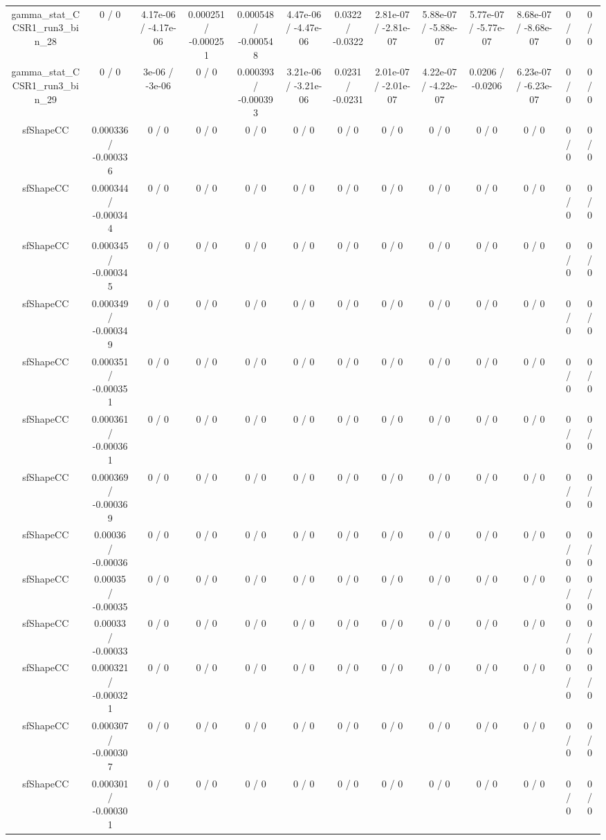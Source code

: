 \documentclass[10pt]{article}
\begin{document}
\begin{table}[htbp]
\begin{center}
\begin{tabular}{|c|c|c|c|c|c|c|c|c|c|c|c|c|}
  gamma_stat_CCSR1_run3_bin_28 & 0 / 0 & 4.17e-06 / -4.17e-06 & 0.000251 / -0.000251 & 0.000548 / -0.000548 & 4.47e-06 / -4.47e-06 & 0.0322 / -0.0322 & 2.81e-07 / -2.81e-07 & 5.88e-07 / -5.88e-07 & 5.77e-07 / -5.77e-07 & 8.68e-07 / -8.68e-07 & 0 / 0 & 0 / 0 \\ 
  gamma_stat_CCSR1_run3_bin_29 & 0 / 0 & 3e-06 / -3e-06 & 0 / 0 & 0.000393 / -0.000393 & 3.21e-06 / -3.21e-06 & 0.0231 / -0.0231 & 2.01e-07 / -2.01e-07 & 4.22e-07 / -4.22e-07 & 0.0206 / -0.0206 & 6.23e-07 / -6.23e-07 & 0 / 0 & 0 / 0 \\ 
  sfShapeCC & 0.000336 / -0.000336 & 0 / 0 & 0 / 0 & 0 / 0 & 0 / 0 & 0 / 0 & 0 / 0 & 0 / 0 & 0 / 0 & 0 / 0 & 0 / 0 & 0 / 0 \\ 
  sfShapeCC & 0.000344 / -0.000344 & 0 / 0 & 0 / 0 & 0 / 0 & 0 / 0 & 0 / 0 & 0 / 0 & 0 / 0 & 0 / 0 & 0 / 0 & 0 / 0 & 0 / 0 \\ 
  sfShapeCC & 0.000345 / -0.000345 & 0 / 0 & 0 / 0 & 0 / 0 & 0 / 0 & 0 / 0 & 0 / 0 & 0 / 0 & 0 / 0 & 0 / 0 & 0 / 0 & 0 / 0 \\ 
  sfShapeCC & 0.000349 / -0.000349 & 0 / 0 & 0 / 0 & 0 / 0 & 0 / 0 & 0 / 0 & 0 / 0 & 0 / 0 & 0 / 0 & 0 / 0 & 0 / 0 & 0 / 0 \\ 
  sfShapeCC & 0.000351 / -0.000351 & 0 / 0 & 0 / 0 & 0 / 0 & 0 / 0 & 0 / 0 & 0 / 0 & 0 / 0 & 0 / 0 & 0 / 0 & 0 / 0 & 0 / 0 \\ 
  sfShapeCC & 0.000361 / -0.000361 & 0 / 0 & 0 / 0 & 0 / 0 & 0 / 0 & 0 / 0 & 0 / 0 & 0 / 0 & 0 / 0 & 0 / 0 & 0 / 0 & 0 / 0 \\ 
  sfShapeCC & 0.000369 / -0.000369 & 0 / 0 & 0 / 0 & 0 / 0 & 0 / 0 & 0 / 0 & 0 / 0 & 0 / 0 & 0 / 0 & 0 / 0 & 0 / 0 & 0 / 0 \\ 
  sfShapeCC & 0.00036 / -0.00036 & 0 / 0 & 0 / 0 & 0 / 0 & 0 / 0 & 0 / 0 & 0 / 0 & 0 / 0 & 0 / 0 & 0 / 0 & 0 / 0 & 0 / 0 \\ 
  sfShapeCC & 0.00035 / -0.00035 & 0 / 0 & 0 / 0 & 0 / 0 & 0 / 0 & 0 / 0 & 0 / 0 & 0 / 0 & 0 / 0 & 0 / 0 & 0 / 0 & 0 / 0 \\ 
  sfShapeCC & 0.00033 / -0.00033 & 0 / 0 & 0 / 0 & 0 / 0 & 0 / 0 & 0 / 0 & 0 / 0 & 0 / 0 & 0 / 0 & 0 / 0 & 0 / 0 & 0 / 0 \\ 
  sfShapeCC & 0.000321 / -0.000321 & 0 / 0 & 0 / 0 & 0 / 0 & 0 / 0 & 0 / 0 & 0 / 0 & 0 / 0 & 0 / 0 & 0 / 0 & 0 / 0 & 0 / 0 \\ 
  sfShapeCC & 0.000307 / -0.000307 & 0 / 0 & 0 / 0 & 0 / 0 & 0 / 0 & 0 / 0 & 0 / 0 & 0 / 0 & 0 / 0 & 0 / 0 & 0 / 0 & 0 / 0 \\ 
  sfShapeCC & 0.000301 / -0.000301 & 0 / 0 & 0 / 0 & 0 / 0 & 0 / 0 & 0 / 0 & 0 / 0 & 0 / 0 & 0 / 0 & 0 / 0 & 0 / 0 & 0 / 0 \\ 

\end{tabular}
\end{center}
\end{table}
\end{document}
